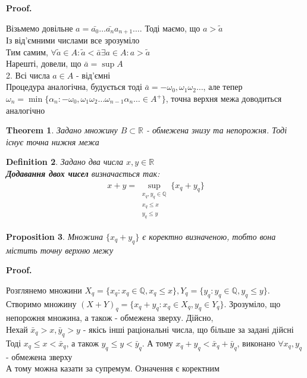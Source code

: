 \documentclass[a4paper, 14pt]{article}
\makeatletter
\def\qed{$\blacksquare$}
\theoremstyle{theoremdd}
\newtheorem{theorem}{Theorem}[subsection]
\theoremstyle{theoremdd}
\newtheorem{definition}[theorem]{Definition}
\theoremstyle{theoremdd}
\theoremstyle{theoremdd}
\theoremstyle{theoremdd}
\newtheorem{proposition}[theorem]{Proposition}
\theoremstyle{theoremdd}
\theoremstyle{theoremdd}
\theoremstyle{theoremdd}
\renewenvironment{proof}[1][Proof.\\]{\par
\pushQED{\hfill \qed}%
\normalfont \topsep6\p@\@plus6\p@\relax
\trivlist
\item\relax
{\bfseries
#1\@addpunct{.}}\hspace\labelsep\ignorespaces
}{%
\popQED\endtrivlist\@endpefalse
}
\makeatother
\begin{document}
\begin{proof}
Візьмемо довільне $a = \bar{a_0}\dots \bar{a_n} a_{n+1} \dots$. Тоді маємо, що $a > \tilde{a}$\\
Із від'ємними числами все зрозуміло\\
Тим самим, $\forall \tilde{a} \in A: \tilde{a} < \bar{a} \exists a \in A: a > \tilde{a}$
\bigskip \\
Нарешті, довели, що $\bar{a} = \sup A$
\bigskip \\
2. Всі числа $a \in A$ - від'ємні\\
Процедура аналогічна, будується тоді $\bar{a} = -\omega_0,\omega_1\omega_2\dots$, але тепер\\ $\omega_n = \min \{\alpha_n: -\omega_0,\omega_1\omega_2\dots \omega_{n-1} \alpha_n \dots \in A^+ \}$, точна верхня межа доводиться аналогічно
\end{proof}

\begin{theorem}
Задано множину $B \subset \mathbb{R}$ - обмежена знизу та непорожня. Тоді існує точна нижня межа
\end{theorem}

\begin{definition}
Задано два числа $x,y \in \mathbb{R}$\\
\textbf{Додавання двох чисел} визначається так:
\begin{align*}
x+y = \sup_{\substack{x_q,y_q \in \mathbb{Q} \\ x_q \leq x \\ y_q \leq y}} \{x_q + y_q\}
\end{align*}
\end{definition}

\begin{proposition}
Множина $\{x_q+y_q\}$ є коректно визначеною, тобто вона містить точну верхню межу
\end{proposition}

\begin{proof}
Розглянемо множини $X_q = \{x_q: x_q \in \mathbb{Q}, x_q \leq x\}, Y_q = \{y_q: y_q \in \mathbb{Q}, y_q \leq y\}$.\\
Створимо множину $(X+Y)_q = \{x_q+y_q: x_q \in X_q, y_q \in Y_q\}$. Зрозуміло, що непорожня множина, а також - обмежена зверху. Дійсно,\\
Нехай $\bar{x}_q > x, \bar{y}_q > y$ - якісь інші раціональні числа, що більше за задані дійсні\\
Тоді $x_q \leq x < \bar{x}_q$, а також $y_q \leq y < \bar{y}_q$. А тому $x_q + y_q < \bar{x}_q + \bar{y}_q$, виконано $\forall x_q,y_q$ - обмежена зверху\\
А тому можна казати за супремум. Означення є коректним
\end{proof}
\end{document}
